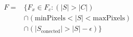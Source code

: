 \begin{equation}
\begin{aligned}
F ={} & \{F_{x} \in  F_{c} : (|S| > |C|) \\
      & \cap (\mathrm{minPixels}  < |S| < \mathrm{maxPixels}) \\
      & \cap (|S_{\mathrm{conected}}| > |S| - \epsilon)\}
\end{aligned}
\end{equation}